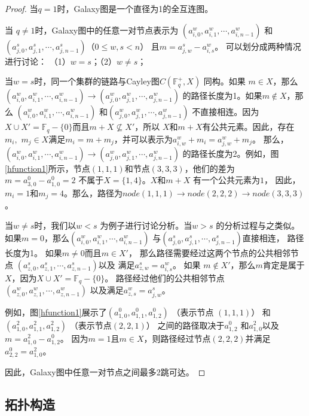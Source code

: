 \begin{proof}

当$q=1$时，Galaxy图是一个直径为1的全互连图。

当 $q\neq1$时，Galaxy图中的任意一对节点表示为
$(a_{i,0}^{w}, a_{i,1}^{w},\cdots ,a_{i,n-1}^{w})$
和$(a_{j,0}^{s}, a_{j,1}^{s}, \cdots,  a_{j,n-1}^{s})$（$0\leq w,s < n$）
且$m=a_{j,w}^{s}-a_{i,s}^{w}$。 可以划分成两种情况进行讨论：
（1）$w=s$；（2）$w\neq s$；

当$w=s$时，同一个集群的链路与Cayley图$C(\mathds{F}_q^+, X)$ 同构。如果
$m\in X$，那么$(a_{i,0}^{w}, a_{i,1}^{w},\cdots ,a_{i,n-1}^{w}) \rightarrow (a_{j,0}^{w}, a_{j,1}^{w},\cdots ,a_{j,n-1}^{w})$
的路径长度为1。如果$m\notin X$，那么 $(a_{i,0}^{w}, a_{i,1}^{w},\cdots ,a_{i,n-1}^{w})$
和$(a_{j,0}^{w}, a_{j,1}^{w},\cdots ,a_{j,n-1}^{w})$
不直接相连。因为$X\cup X'=\mathds{F}_q-\{0\}$而且$m+X \nsubseteq X'$，所以
$X$和$m+X$有公共元素。因此，存在$m_i,$ $m_j\in X$满足$m_i=m+m_j$，并可以表示为$a_{i,w}^{w}+m_i=a_{j,w}^{w}+m_j$。
那么，$(a_{i,0}^{w}, a_{i,1}^{w},\cdots ,a_{i,n-1}^{w}) \rightarrow (a_{j,0}^{w}, a_{j,1}^{w},\cdots ,a_{j,n-1}^{w})$
的路径长度为2。例如，图\ref{hfunction1}所示，节点$(1,1,1)$和节点$(3,3,3)$，他们的差为
$m=a_{3,0}^{0}-a_{1,0}^{0}=2$ 不属于$X=\{1,4\}$。$X$和$m+X$ 有一个公共元素为${1}$，
因此，$m_i=1$和$m_j=4$。那么，路径为$node(1,1,1)\rightarrow node(2,2,2)\rightarrow node(3,3,3)$。

当$w\neq s$时，我们以$w < s$ 为例子进行讨论分析。当$w > s$ 的分析过程与之类似。
如果$m=0$，那么$(a_{i,0}^{w}, a_{i,1}^{w},\cdots ,a_{i,n-1}^{w})$
与$(a_{j,0}^{s}, a_{j,1}^{s}, \cdots,  a_{j,n-1}^{s})$直接相连，
路径长度为1。 如果$m\neq 0$而且$m\in X'$，
那么路径需要经过这两个节点的公共相邻节点
$(a_{z,0}^{s}, a_{z,1}^{s}, \cdots, a_{z,n-1}^{s})$以及
满足$a_{z,w}^{s}=a_{i,s}^{w}$。 如果
$m\notin X'$，那么$m$肯定是属于$X$，因为$X\cup X'=\mathds{F}_q-\{0\}$。
路径经过他们的公共相邻节点$(a_{z,0}^{w}, a_{z,1}^{w}, \cdots, a_{z,n-1}^{w})$
以及满足$a_{z,s}^{w}=a_{j,w}^{s}$。

例如，图\ref{hfunction1}展示了$(a_{1,0}^{0}, a_{1,1}^{0}, a_{1,2}^{0})$
（表示节点 $(1,1,1)$） 和 $(a_{1,0}^{2}, a_{1,1}^{2}, a_{1,2}^{2} )$ （表示节点$(2,2,1)$）
 之间的路径取决于$a_{1,2}^{0}$ 和$a_{1,0}^{2}$以及$m=a_{1,0}^{2}-a_{1,2}^{0}$。
 因为$m=1$且$m\in X$，则路径经过节点$(2,2,2)$并满足$ a_{2,2}^{0}= a_{1,0}^{2}$。

 因此，Galaxy图中任意一对节点之间最多2跳可达。

 \end{proof}

 \subsection{拓扑构造}

